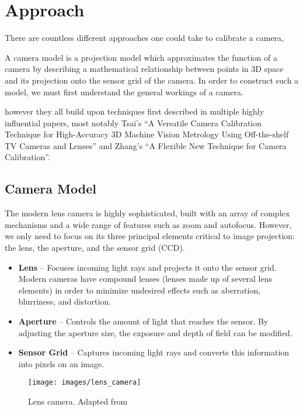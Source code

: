 \section{Approach} 

There are countless different approaches one could take to calibrate a camera, 

A camera model is a projection model which approximates the function of a camera by describing a mathematical relationship between points in 3D space and its projection onto the sensor grid of the camera. In order to construct such a model, we must first understand the general workings of a camera.

however they all build upon techniques first described in multiple highly influential papers, most notably Tsai's ``A Versatile Camera Calibration Technique for High-Accuracy 3D Machine Vision Metrology Using Off-the-shelf TV Cameras and Lenses'' and Zhang's ``A Flexible New Technique for Camera Calibration''. 

\subsection{Camera Model} \label{sec:camera_model}

The modern lens camera is highly sophisticated, built with an array of complex mechanisms and a wide range of features such as zoom and autofocus. However, we only need to focus on its three principal elements critical to image projection: the lens, the aperture, and the sensor grid (CCD). 

\begin{itemize}[leftmargin=!, itemindent=-5ex]
    \item \textbf{Lens} -- Focuses incoming light rays and projects it onto the sensor grid. Modern cameras have compound lenses (lenses made up of several lens elements) in order to minimize undesired effects such as aberration, blurriness, and distortion. 
    \item \textbf{Aperture} -- Controls the amount of light that reaches the sensor. By adjusting the aperture size, the exposure and depth of field can be modified.
    \item \textbf{Sensor Grid} -- Captures incoming light rays and converts this information into pixels on an image. 
\end{itemize}

\begin{figure}[H]
    \centering
    \texttt{[image: images/lens\_camera]}
    \caption{Lens camera. Adapted from \cite{coltonPhysics1232012}} \label{fig:lens_camera}
\end{figure}

